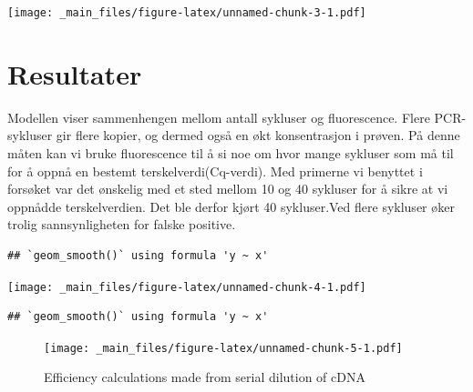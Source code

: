 \documentclass[
]{book}
\begin{document}
\texttt{[image: \_main\_files/figure-latex/unnamed-chunk-3-1.pdf]}

\hypertarget{resultater-2}{%
\section{Resultater}\label{resultater-2}}

Modellen viser sammenhengen mellom antall sykluser og fluorescence. Flere PCR-sykluser gir flere kopier, og dermed også en økt konsentrasjon i prøven. På denne måten kan vi bruke fluorescence til å si noe om hvor mange sykluser som må til for å oppnå en bestemt terskelverdi(Cq-verdi). Med primerne vi benyttet i forsøket var det ønskelig med et sted mellom 10 og 40 sykluser for å sikre at vi oppnådde terskelverdien. Det ble derfor kjørt 40 sykluser.Ved flere sykluser øker trolig sannsynligheten for falske positive.

\begin{verbatim}
## `geom_smooth()` using formula 'y ~ x'
\end{verbatim}

\texttt{[image: \_main\_files/figure-latex/unnamed-chunk-4-1.pdf]}

\begin{verbatim}
## `geom_smooth()` using formula 'y ~ x'
\end{verbatim}

\begin{figure}
\centering
\texttt{[image: \_main\_files/figure-latex/unnamed-chunk-5-1.pdf]}
\caption{\label{fig:unnamed-chunk-5}Efficiency calculations made from serial dilution of cDNA}
\end{figure}
\end{document}
